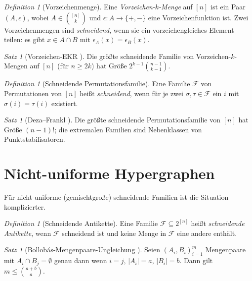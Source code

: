 \documentclass[12pt,a4paper]{amsart}
\theoremstyle{definition}
\theoremstyle{remark}
\newtheorem{satz}[theorem]{Satz}
\newtheorem{definition_de}[theorem]{Definition}
\begin{document}
\begin{definition_de}[Vorzeichenmenge]
Eine \emph{Vorzeichen-$k$-Menge} auf $[n]$ ist ein Paar $(A, \epsilon)$, wobei
$A \in \binom{[n]}{k}$ und $\epsilon: A \to \{+, -\}$ eine Vorzeichenfunktion ist.
Zwei Vorzeichenmengen sind \emph{schneidend}, wenn sie ein vorzeichengleiches
Element teilen: es gibt $x \in A \cap B$ mit $\epsilon_A(x) = \epsilon_B(x)$.
\end{definition_de}

\begin{satz}[Vorzeichen-EKR \cite{DezaFranklFuredi1983}]\label{satz:zeichen_ekr}
Die größte schneidende Familie von Vorzeichen-$k$-Mengen auf $[n]$ (für $n \geq 2k$)
hat Größe $2^{k-1}\binom{n-1}{k-1}$.
\end{satz}

\begin{definition_de}[Schneidende Permutationsfamilie]
Eine Familie $\mathcal{F}$ von Permutationen von $[n]$ heißt \emph{schneidend},
wenn für je zwei $\sigma, \tau \in \mathcal{F}$ ein $i$ mit $\sigma(i) = \tau(i)$
existiert.
\end{definition_de}

\begin{satz}[Deza--Frankl \cite{DezaFranklPerm1983}]\label{satz:deza_frankl_perm}
Die größte schneidende Permutationsfamilie von $[n]$ hat Größe $(n-1)!$;
die extremalen Familien sind Nebenklassen von Punktstabilisatoren.
\end{satz}

\section{Nicht-uniforme Hypergraphen}\label{sec:nicht_uniform}

Für nicht-uniforme (gemischtgroße) schneidende Familien ist die Situation
komplizierter.

\begin{definition_de}[Schneidende Antikette]
Eine Familie $\mathcal{F} \subseteq 2^{[n]}$ heißt \emph{schneidende Antikette},
wenn $\mathcal{F}$ schneidend ist und keine Menge in $\mathcal{F}$ eine andere
enthält.
\end{definition_de}

\begin{satz}[Bollobás-Mengenpaare-Ungleichung \cite{Bollobas1965}]\label{satz:bollobas}
Seien $(A_i, B_i)_{i=1}^m$ Mengenpaare mit $A_i \cap B_j = \emptyset$ genau dann
wenn $i = j$, $|A_i| = a$, $|B_i| = b$. Dann gilt $m \leq \binom{a+b}{a}$.
\end{satz}
\end{document}

